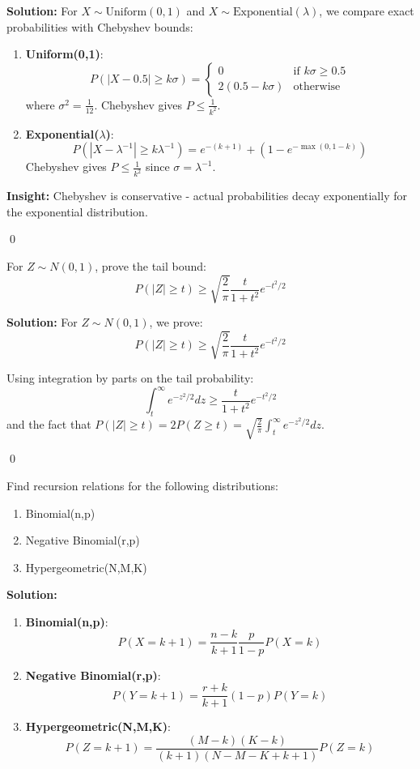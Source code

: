 \noindent\textbf{Solution:}
For $X \sim \text{Uniform}(0,1)$ and $X \sim \text{Exponential}(\lambda)$, we compare exact probabilities with Chebyshev bounds:

\begin{enumerate}
\item \textbf{Uniform(0,1)}:
\[ P(|X-0.5| \geq k\sigma) = 
\begin{cases} 
0 & \text{if } k\sigma \geq 0.5 \\
2(0.5 - k\sigma) & \text{otherwise}
\end{cases}
\]
where $\sigma^2 = \frac{1}{12}$. Chebyshev gives $P \leq \frac{1}{k^2}$.

\item \textbf{Exponential($\lambda$)}:
\[ P(|X-\lambda^{-1}| \geq k\lambda^{-1}) = e^{-(k+1)} + (1 - e^{-\max(0,1-k)}) \]
Chebyshev gives $P \leq \frac{1}{k^2}$ since $\sigma = \lambda^{-1}$.
\end{enumerate}

\textbf{Insight:} Chebyshev is conservative - actual probabilities decay exponentially for the exponential distribution.


\qed
\begin{problembox}
For $Z \sim N(0,1)$, prove the tail bound:
\[ P(|Z| \geq t) \geq \sqrt{\frac{2}{\pi}}\frac{t}{1+t^2}e^{-t^2/2} \]
\end{problembox}

\noindent\textbf{Solution:}
For $Z \sim N(0,1)$, we prove:
\[ P(|Z| \geq t) \geq \sqrt{\frac{2}{\pi}}\frac{t}{1+t^2}e^{-t^2/2} \]

Using integration by parts on the tail probability:
\[ \int_t^\infty e^{-z^2/2}dz \geq \frac{t}{1+t^2}e^{-t^2/2} \]
and the fact that $P(|Z|\geq t) = 2P(Z\geq t) = \sqrt{\frac{2}{\pi}}\int_t^\infty e^{-z^2/2}dz$.


\qed
\begin{problembox}
Find recursion relations for the following distributions:
\begin{enumerate}
\item Binomial(n,p)
\item Negative Binomial(r,p)
\item Hypergeometric(N,M,K)
\end{enumerate}
\end{problembox}

\noindent\textbf{Solution:}
\begin{enumerate}
\item \textbf{Binomial(n,p)}:
\[ P(X=k+1) = \frac{n-k}{k+1}\frac{p}{1-p}P(X=k) \]

\item \textbf{Negative Binomial(r,p)}:
\[ P(Y=k+1) = \frac{r+k}{k+1}(1-p)P(Y=k) \]

\item \textbf{Hypergeometric(N,M,K)}:
\[ P(Z=k+1) = \frac{(M-k)(K-k)}{(k+1)(N-M-K+k+1)}P(Z=k) \]
\end{enumerate}


